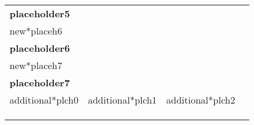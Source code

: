 \documentclass{article}
\begin{document}
\begin{table}[h]
{\begin{tabularx}{\textwidth}{|Xccll|c|}
\multicolumn{5}{|l|}{\textbf{placeholder5}}                                                       &                                             \\
\multicolumn{5}{|l|}{new*placeh6}                                                                           &                                             \\
\multicolumn{5}{|l|}{\textbf{placeholder6}}                                                             &                                             \\
\multicolumn{5}{|l|}{new*placeh7}                                                                                           &                                             \\
\multicolumn{5}{|l|}{\textbf{placeholder7}}                                                                                               &                                             \\ \cline{1-5}
\multicolumn{3}{|l|}{additional*plch0} & \multicolumn{1}{l|}{additional*plch1}           & additional*plch2  \hspace{20px}          &                                             \\ \cline{1-5}
\multicolumn{3}{|l|}{\multirow{3}{*}{}}                    & \multicolumn{1}{l|}{\multirow{3}{*}{}} & \multirow{3}{*}{} &                                             \\
\multicolumn{3}{|l|}{}                                     & \multicolumn{1}{l|}{}                  &                   &                                             \\
\multicolumn{3}{|l|}{}                                     & \multicolumn{1}{l|}{}                               &                   &                                             \\ \hline
\end{tabularx}
}
\end{table}
\end{document}
